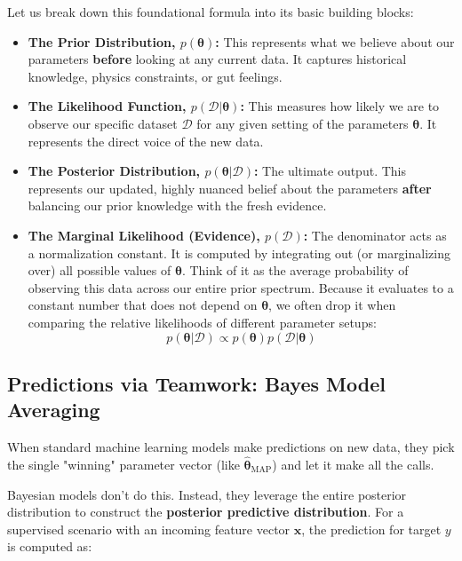 \documentclass{article}
\begin{document}
Let us break down this foundational formula into its basic building blocks:
\begin{itemize}
    \item \textbf{The Prior Distribution, $p(\boldsymbol{\theta})$:} This represents what we believe about our parameters \textbf{before} looking at any current data. It captures historical knowledge, physics constraints, or gut feelings.
    \item \textbf{The Likelihood Function, $p(\mathcal{D}|\boldsymbol{\theta})$:} This measures how likely we are to observe our specific dataset $\mathcal{D}$ for any given setting of the parameters $\boldsymbol{\theta}$. It represents the direct voice of the new data.
    \item \textbf{The Posterior Distribution, $p(\boldsymbol{\theta}|\mathcal{D})$:} The ultimate output. This represents our updated, highly nuanced belief about the parameters \textbf{after} balancing our prior knowledge with the fresh evidence.
    \item \textbf{The Marginal Likelihood (Evidence), $p(\mathcal{D})$:} The denominator acts as a normalization constant. It is computed by integrating out (or marginalizing over) all possible values of $\boldsymbol{\theta}$. Think of it as the average probability of observing this data across our entire prior spectrum. Because it evaluates to a constant number that does not depend on $\boldsymbol{\theta}$, we often drop it when comparing the relative likelihoods of different parameter setups:
    \begin{equation}
    p(\boldsymbol{\theta}|\mathcal{D}) \propto p(\boldsymbol{\theta})p(\mathcal{D}|\boldsymbol{\theta})
    \end{equation}
\end{itemize}

\subsection{Predictions via Teamwork: Bayes Model Averaging}
When standard machine learning models make predictions on new data, they pick the single "winning" parameter vector (like $\hat{\boldsymbol{\theta}}_{\text{MAP}}$) and let it make all the calls. 

Bayesian models don't do this. Instead, they leverage the entire posterior distribution to construct the \textbf{posterior predictive distribution}. For a supervised scenario with an incoming feature vector $\mathbf{x}$, the prediction for target $y$ is computed as:
\end{document}
